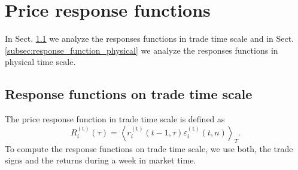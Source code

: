 \section{Price response functions}\label{sec:response_functions}

In Sect. \ref{subsec:response_function_trade} we analyze the responses
functions in trade time scale and in Sect.
\ref{subsec:response_function_physical} we analyze the responses functions in
physical time scale.


\subsection{Response functions on trade time scale}
\label{subsec:response_function_trade}

The price response function in trade time scale is defined as
\cite{my_paper_response_financial}
\begin{equation}\label{eq:response_functions_trade_scale_general}
    R^{\left(\textrm{t}\right)}_{i}\left(\tau\right)=\left\langle
    r^{\left(\textrm{t}\right)}_{i}\left(t-1,\tau \right)
    \varepsilon_{i}^{\left(\textrm{t}\right)}
    \left(t, n\right)\right\rangle _{T}.
\end{equation}
To compute the response functions on trade time scale, we use both, the trade
signs and the returns during a week in market time.

